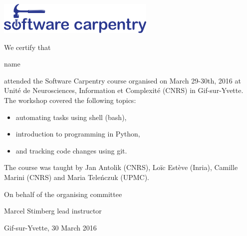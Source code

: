 \documentclass[a4paper,12pt]{article}
\begin{document}
\thispagestyle{empty}
\begin{center}
\includegraphics{software-carpentry-banner.png}
\vspace{2.5cm}
\end{center}

We certify that

\vspace{1cm}

\begin{center}

    {\Large {{ name }}}

\end{center}

\vspace{1cm}

\noindent attended the Software Carpentry course organised on March 29-30th, 2016 at Unité de Neurosciences, Information et Complexité (CNRS) in Gif-sur-Yvette. The workshop covered the following topics:

\begin{itemize}
    \item automating tasks using shell (bash),
    \item introduction to programming in Python,
    \item and tracking code changes using git.
\end{itemize} 

The course was taught by Jan Antolik (CNRS), Loïc Estève (Inria), Camille Marini (CNRS) and Maria Teleńczuk (UPMC).

\vspace{1cm}


\noindent On behalf of the organising committee

\vspace{2cm}

\noindent Marcel Stimberg \newline
lead instructor

\vspace{1cm}

\noindent Gif-sur-Yvette, 30 March 2016
\end{document}
